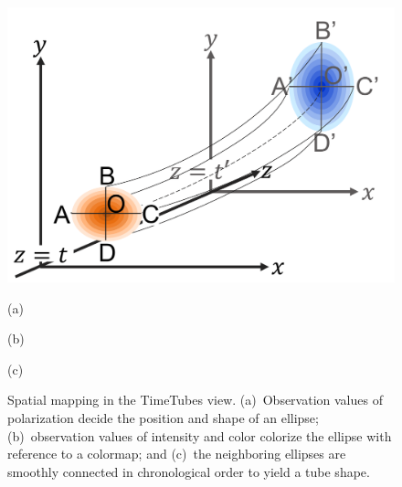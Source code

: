 \begin{figure}[tb]
\begin{minipage}{0.26\linewidth}
    \end{minipage}
    \begin{minipage}{0.36\linewidth}
        \centering
        \includegraphics[width=.99\linewidth]{vgtc_journal_latex/figures/howtotube.pdf}
    \end{minipage}
    \begin{minipage}{0.34\linewidth}
        \centering
        \footnotesize{\sf (a)}
        \end{minipage}
    \begin{minipage}{0.26\linewidth}
        \centering
        \footnotesize{\sf (b)}
    \end{minipage}
    \begin{minipage}{0.36\linewidth}
        \centering
        \footnotesize{\sf (c)}
    \end{minipage}
    \caption{Spatial mapping in the TimeTubes view. 
    (a)~Observation values of polarization decide the position and shape of an ellipse;
    (b)~observation values of intensity and color colorize the ellipse with reference to a colormap; and
    (c)~the neighboring ellipses are smoothly connected in chronological order to yield a tube shape.}
    \label{fig:howtoplot}
\end{figure}
